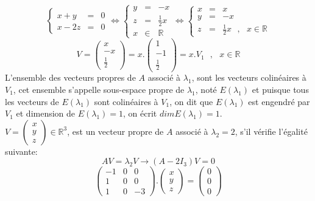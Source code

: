 \documentclass[a4paper,12pt,french]{article}
\begin{document}
	\[\left \{
	\begin{array}{rcl}
		x+y&=&0 \\
		x-2z&=&0
	\end{array}
	\right. \Leftrightarrow \left \{
	\begin{array}{rcl}
		y&=&-x \\
		z&=&\frac{1}{2}x\\
		x& \in& \mathbb{R}
	\end{array}
	\right.\Leftrightarrow \left \{
	\begin{array}{rcl}
		x&=&x \\
		y&=&-x\\
		z&=&\frac{1}{2}x ~~~,~~~x \in \mathbb{R}
		
	\end{array}
	\right.\]
	\[V=\begin{pmatrix}
		x  \\
		-x  \\
		\frac{1}{2}
		
	\end{pmatrix}=x.\begin{pmatrix}
		1  \\
		-1  \\
		\frac{1}{2}
		
	\end{pmatrix}=x.V_{1}~~~,~~~ x \in \mathbb{R}\]
	L'ensemble des vecteurs propres de $A$ associé à $\lambda_{1}$, sont les vecteurs colinéaires à $V_{1}$, cet ensemble s'appelle sous-espace propre de $\lambda_{1}$, noté $E(\lambda_{1})$ et puisque tous les vecteurs de $E(\lambda_{1})$ sont colinéaires à $V_{1}$, on dit que $E(\lambda_{1})$ est engendré par $V_{1}$ et dimension de $E(\lambda_{1})=1$, on écrit $dim E(\lambda_{1})=1$.\\
	$V=\begin{pmatrix}
		x  \\
		y  \\
		z
		
	\end{pmatrix} \in \mathbb{R}^{3}$, est un vecteur propre de $A$ associé à $\lambda_{2}=2$, s'il vérifie l'égalité suivante:\\
	\[AV=\lambda_{2}V \rightarrow (A-2I_{3})V=0\]
	\[\begin{pmatrix}
		-1 & 0 & 0  \\
		1 & 0 & 0 \\
		1 & 0 & -3
		
	\end{pmatrix}.\begin{pmatrix}
		x   \\
		y   \\
		z 
		
	\end{pmatrix}=\begin{pmatrix}
		0   \\
		0  \\
		0 
		
	\end{pmatrix}\] 
\end{document}
